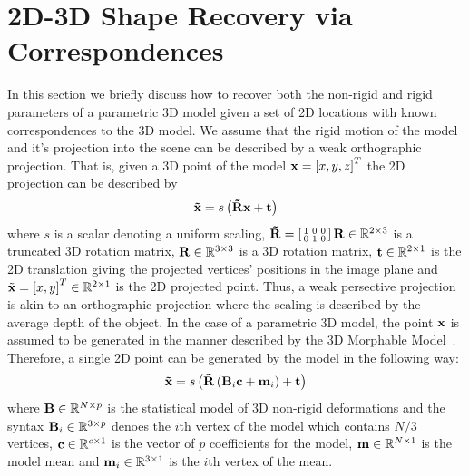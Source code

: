 \section{2D-3D Shape Recovery via Correspondences}\label{sec:face_flow_3d_recovery}
In this section we briefly discuss how to recover both the non-rigid and rigid
parameters of a parametric 3D model given a set of 2D locations with known
correspondences to the 3D model. We assume that the rigid motion of the model
and it's projection into the scene can be described by a weak orthographic
projection. That is, given a 3D point of the model $\boldsymbol{\mathbf{x}} = {[x, y, z]}^T$ the
2D projection can be described by
\begin{equation}
\boldsymbol{\mathbf{\tilde{x}}} = s \left( \boldsymbol{\mathbf{\tilde{R}}} \boldsymbol{\mathbf{x}} + \boldsymbol{\mathbf{t}} \right)
\end{equation}
where $s$ is a scalar denoting a uniform scaling,
$\boldsymbol{\mathbf{\tilde{R}}} = \left[\begin{smallmatrix} 1&0&0\\0&1&0 \end{smallmatrix}\right] \boldsymbol{\mathbf{R}} \in \mathbb{R}^{2 \times 3}$
is a truncated 3D rotation matrix, $\boldsymbol{\mathbf{R}} \in \mathbb{R}^{3 \times 3}$ is a 3D rotation matrix,
$\boldsymbol{\mathbf{t}} \in \mathbb{R}^{2 \times 1}$ is the 2D translation giving the projected vertices'
positions in the image plane and
$\tilde{\boldsymbol{\mathbf{x}}} = {[x, y]}^T \in \mathbb{R}^{2 \times 1}$ is the 2D projected point. 
Thus, a weak persective projection is akin to an orthographic projection where the scaling
is described by the average depth of the object. In the case of a parametric 3D
model, the point $\boldsymbol{\mathbf{x}}$ is assumed to be generated in the manner described
by the 3D Morphable Model~\cite{volker1999morphable}. Therefore, a single 2D
point can be generated by the model in the following way:
\begin{equation}
\boldsymbol{\mathbf{\tilde{x}}} = s \left( \boldsymbol{\mathbf{\tilde{R}}} \left(\boldsymbol{\mathbf{B}}_i \boldsymbol{\mathbf{c}} + \boldsymbol{\mathbf{m}}_i\right) + \boldsymbol{\mathbf{t}} \right)
\end{equation}
where $\boldsymbol{\mathbf{B}} \in \mathbb{R}^{N \times p}$ is the statistical model of 3D non-rigid deformations
and the syntax $\boldsymbol{\mathbf{B}}_i \in \mathbb{R}^{3 \times p}$ denoes the $i$th vertex of the model which
contains $N / 3$ vertices,
$\boldsymbol{\mathbf{c}} \in \mathbb{R}^{c \times 1}$ is the vector of $p$ coefficients for the model,
$\boldsymbol{\mathbf{m}} \in \mathbb{R}^{N \times 1}$ is the model mean and $\boldsymbol{\mathbf{m}}_i \in \mathbb{R}^{3 \times 1}$
is the $i$th vertex of the mean.

